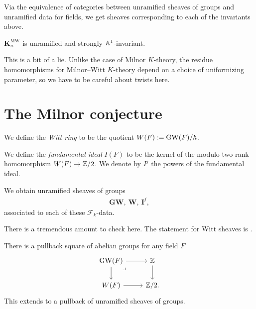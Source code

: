 \documentclass[11pt,openany]{book}
\providecommand{\KMW}{\mathbf{K}^\mathrm{MW}}
\begin{document}
Via the equivalence of categories between unramified sheaves of groups and unramified data for fields, we get sheaves corresponding to each of the invariants above.

\begin{proposition} \cite[p.~71]{Morel}
$\KMW_n$ is unramified and strongly $\mathbb{A}^1$-invariant.
\end{proposition}

\begin{warning} This is a bit of a lie. Unlike the case of Milnor $K$-theory, the residue homomorphisms for Milnor--Witt $K$-theory depend on a choice of uniformizing parameter, so we have to be careful about twists here.
\end{warning}


\section{The Milnor conjecture}

\begin{definition} We define the \textit{Witt ring} to be the quotient $W(F) := \mathrm{GW}(F)/h$.
\end{definition}

\begin{definition} We define the \textit{fundamental ideal} $I(F)$ to be the kernel of the modulo two rank homomorphism $W(F) \to \mathbb{Z}/2$. We denote by $I^j$ the powers of the fundamental ideal.
\end{definition}

\begin{proposition} We obtain unramified sheaves of groups
\begin{align*}
    \mathbf{GW},\ \mathbf{W},\ \mathbf{I}^j,
\end{align*}
associated to each of these $\mathcal{F}_k$-data.
\end{proposition}
There is a tremendous amount to check here. The statement for Witt sheaves is \cite[Corollary~6]{Morel-connectivity}.

\begin{proposition}\label{prop:GW-pullback} 
There is a pullback square of abelian groups for any field $F$
\[ \begin{tikzcd}
    \GW(F)\rar\dar\pb & \Z\dar\\
    W(F)\rar & \Z/2.
\end{tikzcd} \]
This extends to a pullback of unramified sheaves of groups.
\end{proposition}
\end{document}
